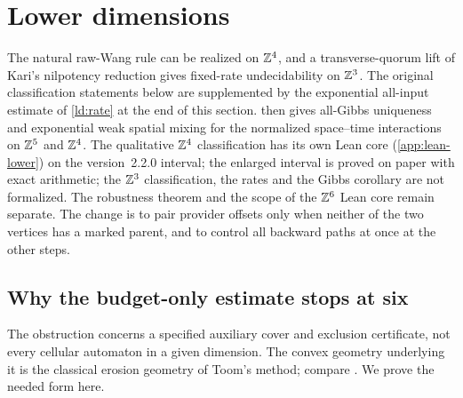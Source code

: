 \section{Lower dimensions}\label{sec:lower}

The natural raw-Wang rule can be realized on $\mathbb{Z}^4$, and a transverse-quorum lift of Kari's nilpotency reduction gives fixed-rate undecidability on $\mathbb{Z}^3$. The original classification statements below are supplemented by the exponential all-input estimate of \cref{ld:rate} at the end of this section.  then gives all-Gibbs uniqueness and exponential weak spatial mixing for the normalized space--time interactions on $\mathbb{Z}^5$ and $\mathbb{Z}^4$. The qualitative $\mathbb{Z}^4$ classification has its own Lean core (\cref{app:lean-lower}) on the version~2.2.0 interval; the enlarged interval is proved on paper with exact arithmetic; the $\mathbb{Z}^3$ classification, the rates and the Gibbs corollary are not formalized. The robustness theorem and the scope of the $\mathbb{Z}^6$ Lean core remain separate. The change is to pair provider offsets only when neither of the two vertices has a marked parent, and to control all backward paths at once at the other steps.

\subsection{Why the budget-only estimate stops at six}

The obstruction concerns a specified auxiliary cover and exclusion certificate, not every cellular automaton in a given dimension. The convex geometry underlying it is the classical erosion geometry of Toom's method; compare \cite{Toom80,SST26}. We prove the needed form here.

